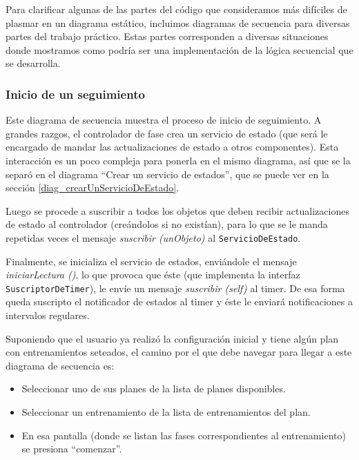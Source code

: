 
Para clarificar algunas de las partes del código que consideramos más difíciles de plasmar en un diagrama estático, incluimos diagramas de secuencia para diversas partes del trabajo práctico. Estas partes corresponden a diversas situaciones donde mostramos como podría ser una implementación de la lógica secuencial que se desarrolla.

\subsubsection{Inicio de un seguimiento}\label{diag_inicioSeguimiento}
Este diagrama de secuencia muestra el proceso de inicio de seguimiento. A grandes razgos, el controlador de fase crea un servicio de estado (que será le encargado de mandar las actualizaciones de estado a otros componentes). Esta interacción es un poco compleja para ponerla en el mismo diagrama, así que se la separó en el diagrama ``Crear un servicio de estados'', que se puede ver en la sección \ref{diag_crearUnServicioDeEstado}. 


Luego se procede a suscribir a todos los objetos que deben recibir actualizaciones de estado al controlador (creándolos si no existían), para lo que se le manda repetidas veces el mensaje \emph{suscribir (unObjeto)} al \texttt{ServicioDeEstado}. 


Finalmente, se inicializa el servicio de estados, enviándole el mensaje \emph{iniciarLectura ()}, lo que provoca que éste (que implementa la interfaz \texttt{SuscriptorDeTimer}), le envíe un mensaje \emph{suscribir (self)} al timer. De esa forma queda suscripto el notificador de estados al timer y éste le enviará notificaciones a intervalos regulares.


Suponiendo que el usuario ya realizó la configuración inicial y tiene algún plan con entrenamientos seteados, el camino por el que debe navegar para llegar a este diagrama de secuencia es:
\begin{itemize}
	\item Seleccionar uno de sus planes de la lista de planes disponibles.
	\item Seleccionar un entrenamiento de la lista de entrenamientos del plan.
	\item En esa pantalla (donde se listan las fases correspondientes al entrenamiento) se presiona ``comenzar''.
\end{itemize}

